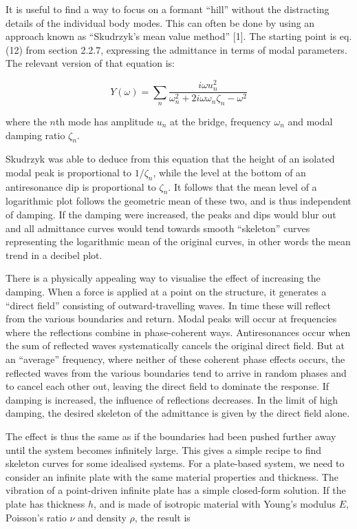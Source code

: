   It is useful to find a way to focus on a formant ``hill'' without the 
  distracting details of the individual body modes. This can often be done by 
  using an approach known as “Skudrzyk’s mean value method” [1]. The starting 
  point is eq. (12) from section 2.2.7, expressing the admittance in terms of 
  modal parameters. The relevant version of that equation is: 

  \begin{equation*}Y(\omega) =\sum_n \dfrac{i \omega u_n^2}{\omega_n^2+2i\omega 
  \omega_n \zeta_n-\omega^2} \tag{1}\end{equation*} 

  \noindent{}where the $n$th mode has amplitude $u_n$ at the bridge, frequency 
  $\omega_n$ and modal damping ratio $\zeta_n$. 

  Skudrzyk was able to deduce from this equation that the height of an isolated 
  modal peak is proportional to $1/\zeta_n$, while the level at the bottom of 
  an antiresonance dip is proportional to $\zeta_n$. It follows that the mean 
  level of a logarithmic plot follows the geometric mean of these two, and is 
  thus independent of damping. If the damping were increased, the peaks and 
  dips would blur out and all admittance curves would tend towards smooth 
  “skeleton” curves representing the logarithmic mean of the original curves, 
  in other words the mean trend in a decibel plot. 

  There is a physically appealing way to visualise the effect of increasing the 
  damping. When a force is applied at a point on the structure, it generates a 
  “direct field” consisting of outward-travelling waves. In time these will 
  reflect from the various boundaries and return. Modal peaks will occur at 
  frequencies where the reflections combine in phase-coherent ways. 
  Antiresonances occur when the sum of reflected waves systematically cancels 
  the original direct field. But at an “average” frequency, where neither of 
  these coherent phase effects occurs, the reflected waves from the various 
  boundaries tend to arrive in random phases and to cancel each other out, 
  leaving the direct field to dominate the response. If damping is increased, 
  the influence of reflections decreases. In the limit of high damping, the 
  desired skeleton of the admittance is given by the direct field alone. 

  The effect is thus the same as if the boundaries had been pushed further away 
  until the system becomes infinitely large. This gives a simple recipe to find 
  skeleton curves for some idealised systems. For a plate-based system, we need 
  to consider an infinite plate with the same material properties and 
  thickness. The vibration of a point-driven infinite plate has a simple 
  closed-form solution. If the plate has thickness $h$, and is made of 
  isotropic material with Young's modulus $E$, Poisson's ratio $\nu$ and 
  density $\rho$, the result is 

